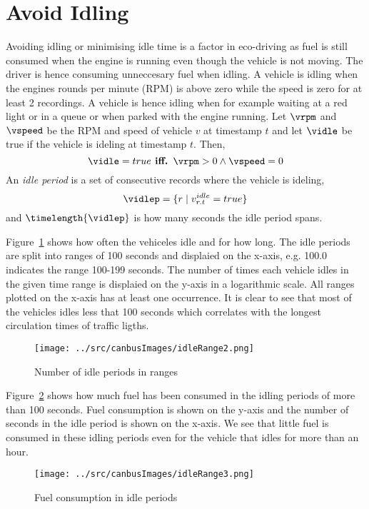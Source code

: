 \section{Avoid Idling}

Avoiding idling or minimising idle time is a factor in eco-driving as fuel is still consumed when the engine is running even though the vehicle is not moving.
The driver is hence consuming unneccesary fuel when idling.
A vehicle is idling when the engines rounds per minute (RPM) is above zero while the speed is zero for at least 2 recordings.
A vehicle is hence idling when for example waiting at a red light or in a queue or when parked with the engine running. 
Let $\vrpm$ and $\vspeed$ be the RPM and speed of vehicle $v$ at timestamp $t$ and let $\vidle$ be true if the vehicle is ideling at timestamp $t$.
Then,
\[\vidle = true \mbox{\textbf{ iff. }} \vrpm> 0 \wedge \vspeed=0 \]
An \textit{idle period} is a set of consecutive records where the vehicle is ideling,
\[\vidlep = \{r \mid v_{r.t}^{idle}= true \}\]
and $\timelength{\vidlep}$ is how many seconds the idle period spans.

Figure~\ref{fig:idleRange2} shows how often the vehiceles idle and for how long.
The idle periods are split into ranges of 100 seconds and displaied on the x-axis, e.g. 100.0 indicates the range 100-199 seconds. 
The number of times each vehicle idles in the given time range is displaied on the y-axis in a logarithmic scale. 
All ranges plotted on the x-axis has at least one occurrence.
It is clear to see that most of the vehicles idles less that 100 seconds which correlates with the longest circulation times of traffic ligths. 
\begin{figure}[htb]
\centering
\texttt{[image: ../src/canbusImages/idleRange2.png]}
\caption{Number of idle periods in ranges}
\label{fig:idleRange2}
\end{figure}

Figure~\ref{fig:idleRange3} shows how much fuel has been consumed in the idling periods of more than 100 seconds. 
Fuel consumption is shown on the y-axis and the number of seconds in the idle period is shown on the x-axis.
We see that little fuel is consumed in these idling periods even for the vehicle that idles for more than an hour.
\begin{figure}[htb]
\centering
\texttt{[image: ../src/canbusImages/idleRange3.png]}
\caption{Fuel consumption in idle periods}
\label{fig:idleRange3}
\end{figure}

